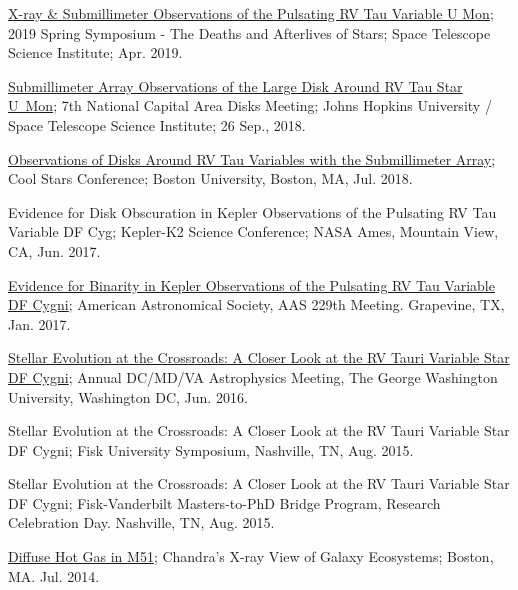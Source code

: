 \documentclass[letter,12pt]{article}
\begin{document}
\begin{etaremune}
\item \href{http://www.stsci.edu/~ofox/posters2019/}{X-ray \& Submillimeter Observations of the Pulsating RV Tau Variable U Mon}; 2019 Spring Symposium - The Deaths and Afterlives of Stars; Space Telescope Science Institute; Apr. 2019.

\item \href{https://sites.google.com/view/ncad7-at-jhu/program?authuser=0}{Submillimeter Array Observations of the Large Disk Around RV Tau Star U~Mon}; 7th National Capital Area Disks Meeting; Johns Hopkins University / Space Telescope Science Institute; 26 Sep., 2018.

\item \href{http://coolstars20.cfa.harvard.edu/abstracts.html#posters}{Observations of Disks Around RV Tau Variables with the Submillimeter Array}; Cool Stars Conference; Boston University, Boston, MA, Jul. 2018.

\item Evidence for Disk Obscuration in Kepler Observations of the Pulsating RV Tau Variable DF Cyg; Kepler-K2 Science Conference; NASA Ames, Mountain View, CA, Jun. 2017.

\item \href{http://adsabs.harvard.edu/abs/2017AAS...22915210V}{Evidence for Binarity in Kepler Observations of the Pulsating RV Tau Variable DF Cygni}; American  Astronomical  Society,  AAS  229th  Meeting. Grapevine, TX, Jan. 2017.

\item \href{https://physics.columbian.gwu.edu/sites/g/files/zaxdzs1976/f/downloads/Astro2016_Conf_program_final.pdf}{Stellar  Evolution at the Crossroads: A Closer Look at the RV Tauri Variable Star DF Cygni};  Annual DC/MD/VA Astrophysics Meeting, The George Washington University, Washington DC, Jun. 2016.

\item Stellar Evolution at the Crossroads: A Closer Look at the RV Tauri Variable Star DF Cygni; Fisk University Symposium, Nashville, TN, Aug. 2015. 

\item Stellar Evolution at the Crossroads: A Closer Look at the RV Tauri Variable Star DF Cygni; Fisk-Vanderbilt Masters-to-PhD Bridge Program, Research Celebration Day. Nashville, TN, Aug. 2015. 

\item \href{http://adsabs.harvard.edu/abs/2014xvge.confE..38S}{Diffuse Hot Gas in M51}; Chandra’s X-ray View of Galaxy Ecosystems; 
Boston, MA. Jul. 2014.


\end{etaremune}
\end{document}
